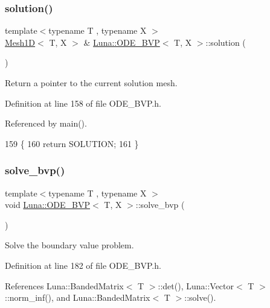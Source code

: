 \subsubsection{\texorpdfstring{solution()}{solution()}}
{\footnotesize\ttfamily template$<$typename T , typename X $>$ \\
\hyperlink{classLuna_1_1Mesh1D}{Mesh1D}$<$ T, X $>$ \& \hyperlink{classLuna_1_1ODE__BVP}{Luna\+::\+O\+D\+E\+\_\+\+B\+VP}$<$ T, X $>$\+::solution (\begin{DoxyParamCaption}{ }\end{DoxyParamCaption})}



Return a pointer to the current solution mesh. 



Definition at line 158 of file O\+D\+E\+\_\+\+B\+V\+P.\+h.



Referenced by main().


\begin{DoxyCode}
159   \{
160     \textcolor{keywordflow}{return} SOLUTION;
161   \}
\end{DoxyCode}
\mbox{\label{classLuna_1_1ODE__BVP_ae035272ad664be6ad5334f1b93a86b15}} 
\subsubsection{\texorpdfstring{solve\+\_\+bvp()}{solve\_bvp()}}
{\footnotesize\ttfamily template$<$typename T , typename X $>$ \\
void \hyperlink{classLuna_1_1ODE__BVP}{Luna\+::\+O\+D\+E\+\_\+\+B\+VP}$<$ T, X $>$\+::solve\+\_\+bvp (\begin{DoxyParamCaption}{ }\end{DoxyParamCaption})}



Solve the boundary value problem. 



Definition at line 182 of file O\+D\+E\+\_\+\+B\+V\+P.\+h.



References Luna\+::\+Banded\+Matrix$<$ T $>$\+::det(), Luna\+::\+Vector$<$ T $>$\+::norm\+\_\+inf(), and Luna\+::\+Banded\+Matrix$<$ T $>$\+::solve().



